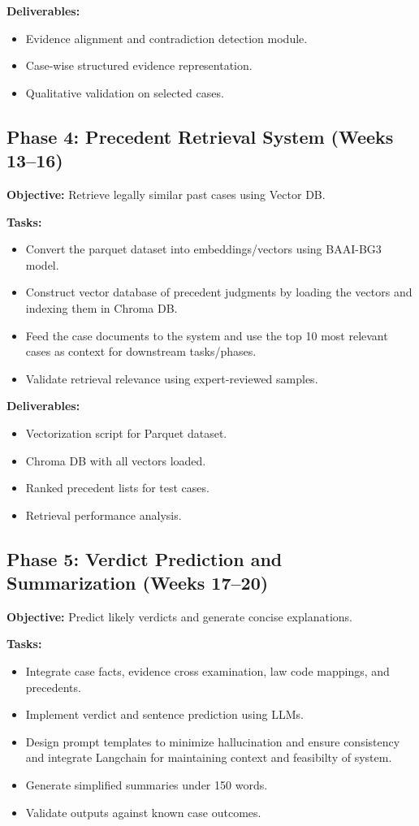 \textbf{Deliverables:}
\begin{itemize}
	\item Evidence alignment and contradiction detection module.
	\item Case-wise structured evidence representation.
	\item Qualitative validation on selected cases.
\end{itemize}

\subsection{Phase 4: Precedent Retrieval System (Weeks 13--16)}
\textbf{Objective:} Retrieve legally similar past cases using Vector DB.

\textbf{Tasks:}
\begin{itemize}
	\item Convert the parquet dataset into embeddings/vectors using BAAI-BG3 model.
	\item Construct vector database of precedent judgments by loading the vectors and indexing them in Chroma DB.
	\item Feed the case documents to the system and use the top 10 most relevant cases as context for downstream tasks/phases.
	\item Validate retrieval relevance using expert-reviewed samples.
\end{itemize}

\textbf{Deliverables:}
\begin{itemize}
	\item Vectorization script for Parquet dataset.
	\item Chroma DB with all vectors loaded.
	\item Ranked precedent lists for test cases.
	\item Retrieval performance analysis.
\end{itemize}

\subsection{Phase 5: Verdict Prediction and Summarization (Weeks 17--20)}
\textbf{Objective:} Predict likely verdicts and generate concise explanations.

\textbf{Tasks:}
\begin{itemize}
	\item Integrate case facts, evidence cross examination, law code mappings, and precedents.
	\item Implement verdict and sentence prediction using LLMs.
	\item Design prompt templates to minimize hallucination and ensure consistency and integrate Langchain for maintaining context and feasibilty of system.
	\item Generate simplified summaries under 150 words.
	\item Validate outputs against known case outcomes.
\end{itemize}

